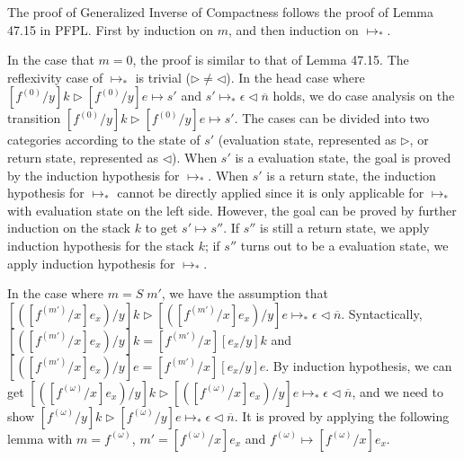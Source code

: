 \documentclass{article}
\newtheorem{lemma}{Lemma}
\begin{document}

The proof of Generalized Inverse of Compactness follows the proof of Lemma 47.15 in PFPL.
First by induction on $m$, and then induction on $\longmapsto_*$.

In the case that $m = 0$, the proof is similar to that of Lemma 47.15.
The reflexivity case of $\longmapsto_*$ is trivial ($\triangleright\neq \triangleleft$).
In the head case where $[f^{(0)}/y]k\triangleright[f^{(0)}/y]e\longmapsto s'$
and $s' \longmapsto_* \epsilon\triangleleft\overline{n}$ holds, we do case analysis on
the transition $[f^{(0)}/y]k\triangleright[f^{(0)}/y]e\longmapsto s'$.
The cases can be divided into two categories
according to the state of $s'$ (evaluation state, represented as $\triangleright$, or return state, represented as $\triangleleft$).
When $s'$ is a evaluation state, the goal is proved by the induction hypothesis for $\longmapsto_*$.
When $s'$ is a return state, the induction hypothesis for $\longmapsto_*$ cannot be directly applied
since it is only applicable for $\longmapsto_*$ with evaluation state on the left side.
However, the goal can be proved by further induction on the stack $k$ to get $s'\longmapsto s''$.
If $s''$ is still a return state, we apply induction hypothesis for the stack $k$;
if $s''$ turns out to be a evaluation state, we apply induction hypothesis for $\longmapsto_*$.

In the case where $m = S\;m'$,
we have the assumption that
$[([f^{(m')}/x]e_x)/y]k\triangleright[([f^{(m')}/x]e_x)/y]e\longmapsto_*\epsilon\triangleleft\overline{n}$.
Syntactically, $[([f^{(m')}/x]e_x)/y]k = [f^{(m')}/x][e_x/y]k$ and $[([f^{(m')}/x]e_x)/y]e = [f^{(m')}/x][e_x/y]e$.
By induction hypothesis, we can get
$[([f^{(\omega)}/x]e_x)/y]k\triangleright[([f^{(\omega)}/x]e_x)/y]e\longmapsto_*\epsilon\triangleleft\overline{n}$,
and we need to show $[f^{(\omega)}/y]k\triangleright[f^{(\omega)}/y]e\longmapsto_*\epsilon\triangleleft\overline{n}$.
%
It is proved by applying the following lemma with $m = f^{(\omega)}$, $m' = [f^{(\omega)}/x]e_x$ and $f^{(\omega)}\longmapsto[f^{(\omega)}/x]e_x$.
\end{document}
